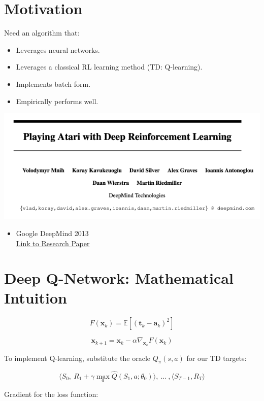 \documentclass[
  letterpaper,
  DIV=11,
  numbers=noendperiod]{scrreprt}
\providecommand{\tightlist}{%
  \setlength{\itemsep}{0pt}\setlength{\parskip}{0pt}}\usepackage{longtable,booktabs,array}
\begin{document}
\section{Motivation}\label{motivation-2}

Need an algorithm that:

\begin{itemize}
\tightlist
\item
  Leverages neural networks.
\item
  Leverages a classical RL learning method (TD: Q-learning).
\item
  Implements batch form.
\item
  Empirically performs well.
\end{itemize}

\begin{center}
\includegraphics[width=0.5\linewidth,height=\textheight,keepaspectratio]{lecture8/images/DQNresearchpaper.png}
\end{center}

\begin{itemize}
\tightlist
\item
  Google DeepMind 2013\\
  \href{https://www.cs.toronto.edu/~vmnih/docs/dqn.pdf}{Link to Research
  Paper}
\end{itemize}

\section{Deep Q-Network: Mathematical
Intuition}\label{deep-q-network-mathematical-intuition}

\[
F(\mathbf{x}_{k}) = \mathbb{E}[(\mathbf{t}_{k} - \mathbf{a}_{k})^2]
\]

\[
\mathbf{x}_{k+1} = \mathbf{x}_{k} - \alpha \nabla_{\mathbf{x}_{k}} F(\mathbf{x}_{k})
\]

To implement Q-learning, substitute the oracle \(Q_{\pi}(s,a)\) for our
TD targets:

\[
\langle S_{0}, \ R_{1} + \gamma \max_{a} \hat{Q}(S_{1},a; \theta_{0})\rangle, \ ... \ ,\langle S_{T-1},R_{T}\rangle
\]

Gradient for the loss function:
\end{document}
